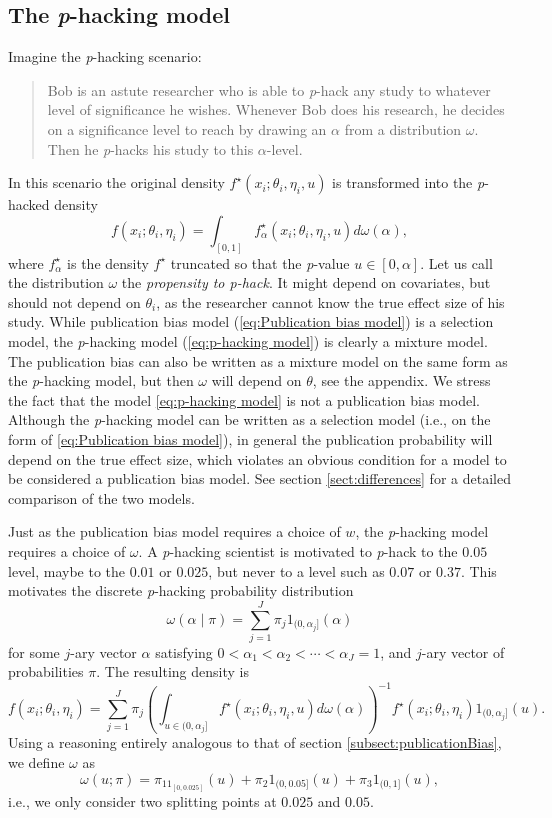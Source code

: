 \documentclass[useAMS,usenatbib,referee]{biom}
\begin{document}
\subsection{The \textit{p}-hacking model}\label{subsect:p-hacking}
Imagine the \textit{p}-hacking scenario:
\begin{quote}
Bob is an astute researcher who is able to \textit{p}-hack any study to whatever level of significance he wishes. Whenever Bob does his research, he decides on a significance level to reach by drawing an $\alpha$ from a distribution $\omega$. Then he \textit{p}-hacks his study to this $\alpha$-level.
\end{quote}
In this scenario the original density $f^{\star}(x_{i};\theta_{i},\eta_{i}, u)$
is transformed into the \textit{p}-hacked density
\begin{equation}\label{eq:p-hacking model}
f(x_{i};\theta_{i},\eta_{i})=\int_{[0,1]}f_\alpha^{\star}(x_{i};\theta_{i},\eta_{i}, u)d\omega(\alpha),
\end{equation}
where $f_\alpha^{\star}$ is the density $f^{\star}$ truncated so that the \textit{p}-value $u\in\left[0,\alpha\right]$. Let us call the distribution $\omega$ the \emph{propensity to p-hack}. It might depend on covariates, but should not depend on $\theta_{i}$, as the researcher cannot know the true effect size of his study. While publication bias model (\ref{eq:Publication bias model}) is a selection model, the \textit{p}-hacking model (\ref{eq:p-hacking model}) is clearly a mixture model. The publication bias can also be written as a mixture model on the same form as the \textit{p}-hacking model, but then $\omega$ will depend on $\theta$, see the appendix. We stress the fact that the model \eqref{eq:p-hacking model} is not a publication bias model. Although the \textit{p}-hacking model can be written as a selection model (i.e., on the form of \eqref{eq:Publication bias model}), in general the publication probability will depend on the true effect size, which violates an obvious condition for a model to be considered a publication bias model. See section \ref{sect:differences} for a detailed comparison of the two models.

Just as the publication bias model requires a choice of $w$, the \textit{p}-hacking model requires a choice of $\omega$. A \textit{p}-hacking scientist is motivated to \textit{p}-hack to the $0.05$ level, maybe to the $0.01$ or $0.025$, but never to a level such as $0.07$ or $0.37$. This motivates the discrete \textit{p}-hacking probability distribution
$$\omega(\alpha\mid\pi)=\sum_{j=1}^{J}\pi_{j}1_{(0,\alpha_{j}]}(\alpha)$$
for some $j$-ary vector $\alpha$ satisfying $0<\alpha_{1}<\alpha_{2}<\cdots<\alpha_{J}=1$,
and $j$-ary vector of probabilities $\pi$. The resulting density is 
\[
f(x_{i};\theta_{i},\eta_{i})=\sum_{j=1}^{J}\pi_{j}\left(\int_{u\in(0,\alpha_{j}]}f^\star(x_{i};\theta_{i},\eta_{i}, u)d\omega(\alpha)\right)^{-1}f^\star(x_{i};\theta_{i},\eta_{i})1_{(0,\alpha_{j}]}(u).
\]
Using a reasoning entirely analogous to that of section \ref{subsect:publicationBias}, we define $\omega$ as
\[
\omega(u;\pi) = \pi_11_{[0,0.025]}(u) + \pi_{2}1_{(0,0.05]}(u) + \pi_{3}1_{(0,1]}(u),
\]
i.e., we only consider two splitting points at $0.025$ and $0.05$.
\end{document}
